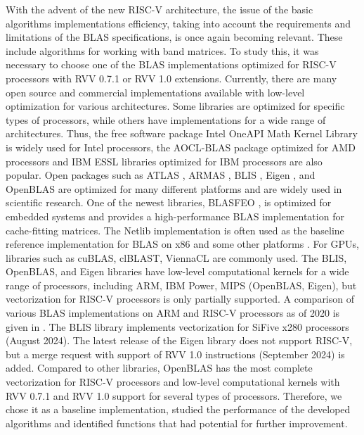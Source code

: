 With the advent of the new RISC-V architecture, the issue of the basic algorithms implementations efficiency, taking into account the requirements and limitations of the BLAS specifications, is once again becoming relevant. These include algorithms for working with band matrices. To study this, it was necessary to choose one of the BLAS implementations optimized for RISC-V processors with RVV 0.7.1 or RVV 1.0 extensions. Currently, there are many open source and commercial implementations available with low-level optimization for various architectures. Some libraries are optimized for specific types of processors, while others have implementations for a wide range of architectures. Thus, the free software package Intel OneAPI Math Kernel Library \cite{c37} is widely used for Intel processors, the AOCL-BLAS package \cite{c39} optimized for AMD processors and IBM ESSL libraries optimized for IBM processors are also popular. Open packages such as ATLAS \cite{c38}, ARMAS \cite{c43}, BLIS \cite{c62}, Eigen \cite{c41}, and OpenBLAS \cite{c40} are optimized for many different platforms and are widely used in scientific research. One of the newest libraries, BLASFEO \cite{c44}, is optimized for embedded systems and provides a high-performance BLAS implementation for cache-fitting matrices. The Netlib implementation is often used as the baseline reference implementation for BLAS on x86 and some other platforms \cite{c59}. For GPUs, libraries such as cuBLAS, clBLAST, ViennaCL are commonly used. The BLIS, OpenBLAS, and Eigen libraries have low-level computational kernels for a wide range of processors, including ARM, IBM Power, MIPS (OpenBLAS, Eigen), but vectorization for RISC-V processors is only partially supported. A comparison of various BLAS implementations on ARM and RISC-V processors as of 2020 is given in \cite{c26}. The BLIS library implements vectorization for SiFive x280 processors (August 2024). The latest release of the Eigen library does not support RISC-V, but a merge request with support of RVV 1.0 instructions (September 2024) is added. Compared to other libraries, OpenBLAS has the most complete vectorization for RISC-V processors and low-level computational kernels with RVV 0.7.1 and RVV 1.0 support for several types of processors. Therefore, we chose it as a baseline implementation, studied the performance of the developed algorithms and identified functions that had potential for further improvement.